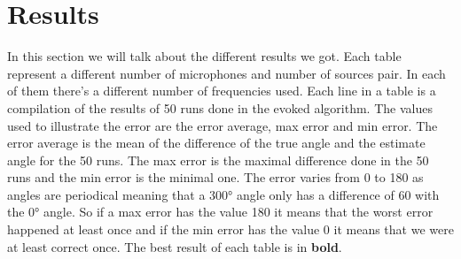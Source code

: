 \section{Results}

In this section we will talk about the different results we got. Each table represent a different number of microphones and number of sources pair. In each of them there's a different number of frequencies used. Each line in a table is a compilation of the results of 50 runs done in the evoked algorithm. The values used to illustrate the error are the error average, max error and min error. The error average is the mean of the difference of the true angle and the estimate angle for the 50 runs. The max error is the maximal difference done in the 50 runs and the min error is the minimal one. The error varies from 0 to 180 as angles are periodical meaning that a 300° angle only has a difference of 60 with the 0° angle. So if a max error has the value 180 it means that the worst error happened at least once and if the min error has the value 0 it means that we were at least correct once. The best result of each table is in \textbf{bold}.

